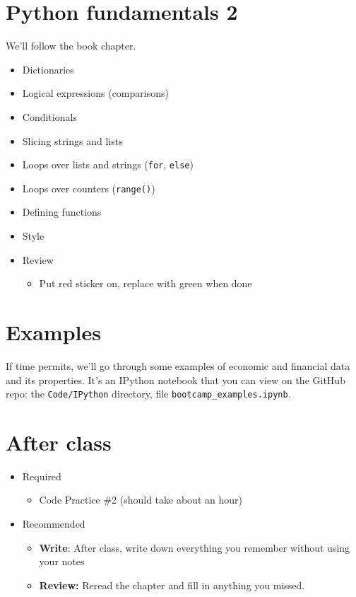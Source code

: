 \documentclass[11pt]{article}
\begin{document}
\section*{Python fundamentals 2}

We'll follow the book chapter.
\begin{itemize}
\item Dictionaries
\item Logical expressions (comparisons)
\item Conditionals
\item Slicing strings and lists
\item Loops over lists and strings ({\tt for}, {\tt else})
\item Loops over counters ({\tt range()})
\item Defining functions
\item Style
\item Review
\begin{itemize}
\item Put red sticker on, replace with green when done
\end{itemize}
\end{itemize}

\section*{Examples}

If time permits, we'll go through some examples of economic and financial data
and its properties.  It's an IPython notebook that you can view on the GitHub repo:
the \verb|Code/IPython| directory,
file \verb|bootcamp_examples.ipynb|.


\section*{After class}

\begin{itemize}
\item Required
\begin{itemize}
\item Code Practice \#2 (should take about an hour)
\end{itemize}
\item Recommended
\begin{itemize}
\item {\bf Write}:  After class, write down everything you remember without using your notes
\item {\bf Review:} Reread the chapter and fill in anything you missed.
\end{itemize}
\end{itemize}


\end{document}
